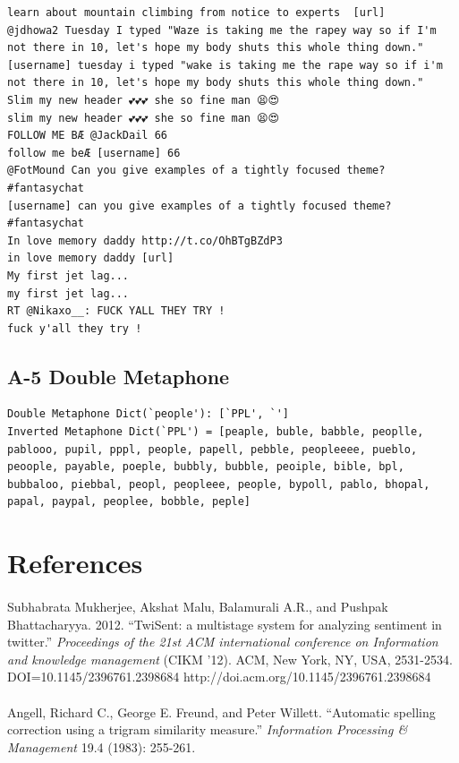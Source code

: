 \documentclass[twocolumn,10pt]{article}
\begin{document}
\begin{lstlisting}
learn about mountain climbing from notice to experts  [url]
@jdhowa2 Tuesday I typed "Waze is taking me the rapey way so if I'm not there in 10, let's hope my body shuts this whole thing down."
[username] tuesday i typed "wake is taking me the rape way so if i'm not there in 10, let's hope my body shuts this whole thing down."
Slim my new header 💕💕💕 she so fine man 😫😍
slim my new header 💕💕💕 she so fine man 😫😍
FOLLOW ME BÆ @JackDail 66
follow me beÆ [username] 66
@FotMound Can you give examples of a tightly focused theme? #fantasychat
[username] can you give examples of a tightly focused theme? #fantasychat
In love memory daddy http://t.co/OhBTgBZdP3
in love memory daddy [url]
My first jet lag...
my first jet lag...
RT @Nikaxo__: FUCK YALL THEY TRY !
fuck y'all they try !
\end{lstlisting}

\subsection*{A-5 Double Metaphone}
\begin{lstlisting}
Double Metaphone Dict(`people'): [`PPL', `']
Inverted Metaphone Dict(`PPL') = [peaple, buble, babble, peoplle, pablooo, pupil, pppl, people, papell, pebble, peopleeee, pueblo, peoople, payable, poeple, bubbly, bubble, peoiple, bible, bpl, bubbaloo, piebbal, peopl, peopleee, people, bypoll, pablo, bhopal, papal, paypal, peoplee, bobble, peple]
\end{lstlisting}


\section*{References}
\footnotesize{
\paragraph{}Subhabrata Mukherjee, Akshat Malu, Balamurali A.R., and Pushpak Bhattacharyya. 2012. ``TwiSent: a multistage system for analyzing sentiment in twitter.'' \textit{Proceedings of the 21st ACM international conference on Information and knowledge management} (CIKM '12). ACM, New York, NY, USA, 2531-2534. DOI=10.1145/2396761.2398684 http://doi.acm.org/10.1145/2396761.2398684

\paragraph{} Angell, Richard C., George E. Freund, and Peter Willett. ``Automatic spelling correction using a trigram similarity measure.'' \textit{Information Processing \& Management} 19.4 (1983): 255-261.

}
\end{document}
